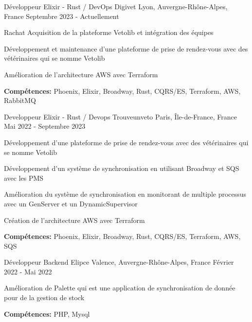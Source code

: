 
\begin{cventries}
  \cventry
    {Développeur Elixir - Rust / DevOps}
    {Digivet}
    {Lyon, Auvergne-Rhône-Alpes, France}
    {Septembre 2023 - Actuellement}
    {
      \begin{cvitems}
        \item {Rachat Acquisition de la plateforme Vetolib et intégration des équipes}
        \item {Développement et maintenance d'une plateforme de prise de rendez-vous avec des vétérinaires qui se nomme Vetolib}
        \item {Amélioration de l'architecture AWS avec Terraform}
        \item {\textbf{Compétences:} Phoenix, Elixir, Broadway, Rust, CQRS/ES, Terraform, AWS, RabbitMQ}
      \end{cvitems}
    }

  \cventry
    {Developpeur Elixir - Rust / Devops}
    {Trouveunveto}
    {Paris, Île-de-France, France}
    {Mai 2022 - Septembre 2023}
    {
      \begin{cvitems}
        \item {Développement d'une plateforme de prise de rendez-vous avec des vétérinaires qui se nomme Vetolib}
        \item {Développement d'un système de synchronisation en utilisant Broadway et SQS avec les PMS}
        \item {Amélioration du système de synchronisation en monitorant de multiple processus avec un GenServer et un DynamicSupervisor}
        \item {Création de l'architecture AWS avec Terraform}
        \item {\textbf{Compétences:} Phoenix, Elixir, Broadway, Rust, CQRS/ES, Terraform, AWS, SQS}
      \end{cvitems}
    }

  \cventry
    {Développeur Backend}
    {Elipce}
    {Valence, Auvergne-Rhône-Alpes, France}
    {Février 2022 - Mai 2022}
    {
      \begin{cvitems}
        \item {Amélioration de Palette qui est une application de synchronisation de donnée pour de la gestion de stock}
        \item {\textbf{Compétences:} PHP, Mysql}
      \end{cvitems}
    }


\end{cventries}

